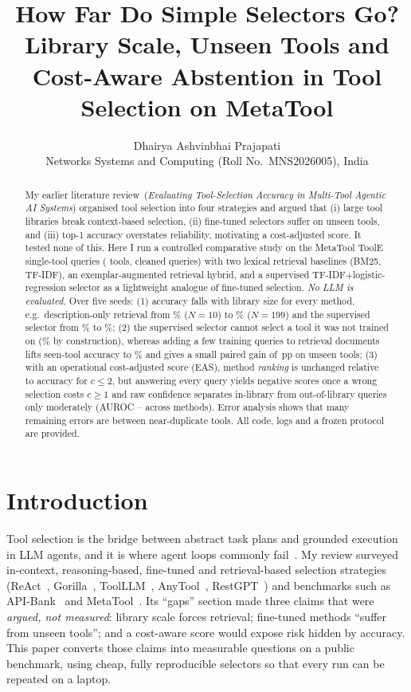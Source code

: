 \documentclass[10pt,twocolumn]{article}
\title{\vspace{-0.4in}\textbf{How Far Do Simple Selectors Go? Library Scale, Unseen Tools and Cost-Aware Abstention in Tool Selection on MetaTool}}
\author{Dhairya Ashvinbhai Prajapati\\ Networks Systems and Computing (Roll No.\ MNS2026005), India}
\date{}
\begin{document}
\maketitle\vspace{-0.2in}
\begin{abstract}
My earlier literature review~(\emph{Evaluating Tool-Selection Accuracy in Multi-Tool Agentic AI Systems}) organised tool selection into four strategies and argued that (i) large tool libraries break context-based selection, (ii) fine-tuned selectors suffer on unseen tools, and (iii) top-1 accuracy overstates reliability, motivating a cost-adjusted score. It tested none of this. Here I run a controlled comparative study on the MetaTool ToolE single-tool queries (\Dtools{} tools, \DfinalRows{} cleaned queries) with two lexical retrieval baselines (BM25, TF-IDF), an exemplar-augmented retrieval hybrid, and a supervised TF-IDF$+$logistic-regression selector as a lightweight analogue of fine-tuned selection. \emph{No LLM is evaluated.} Over five seeds: (1) accuracy falls with library size for every method, e.g.\ description-only retrieval from \EBMNtenTop\% ($N{=}10$) to \EBMNallTop\% ($N{=}199$) and the supervised selector from \ELRNtenTop\% to \ELRNallTop\%; (2) the supervised selector cannot select a tool it was not trained on (\TLRunseen\% by construction), whereas adding a few training queries to retrieval documents lifts seen-tool accuracy to \THybseen\% and gives a small paired gain of \PHybTFdunseen\,pp on unseen tools; (3) with an operational cost-adjusted score (EAS), method \emph{ranking} is unchanged relative to accuracy for $c\le2$, but answering every query yields negative scores once a wrong selection costs $c\ge1$ and raw confidence separates in-library from out-of-library queries only moderately (AUROC \ABM--\ALR{} across methods). Error analysis shows that many remaining errors are between near-duplicate tools. All code, logs and a frozen protocol are provided.
\end{abstract}

\section{Introduction}
Tool selection is the bridge between abstract task plans and grounded execution in LLM agents, and it is where agent loops commonly fail~\cite{qu2025toollearning}. My review surveyed in-context, reasoning-based, fine-tuned and retrieval-based selection strategies (ReAct~\cite{yao2023react}, Gorilla~\cite{patil2023gorilla}, ToolLLM~\cite{qin2023toolllm}, AnyTool~\cite{du2024anytool}, RestGPT~\cite{song2023restgpt}) and benchmarks such as API-Bank~\cite{li2023apibank} and MetaTool~\cite{huang2024metatool}. Its ``gaps'' section made three claims that were \emph{argued, not measured}: library scale forces retrieval; fine-tuned methods ``suffer from unseen tools''; and a cost-aware score would expose risk hidden by accuracy. This paper converts those claims into measurable questions on a public benchmark, using cheap, fully reproducible selectors so that every run can be repeated on a laptop.
\end{document}
